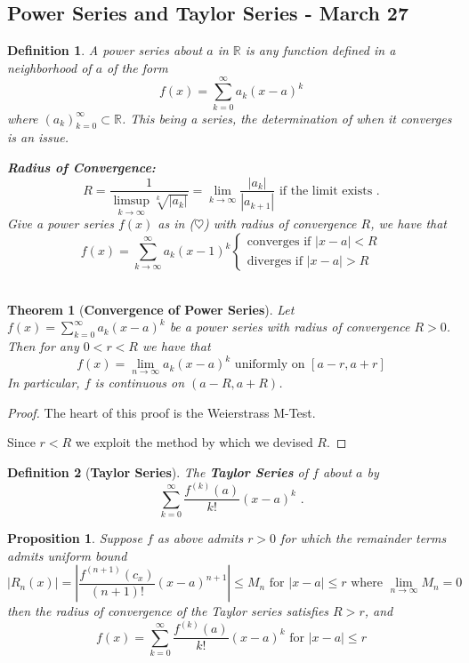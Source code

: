 \documentclass[12pt]{article}
\theoremstyle{plain}
\newtheorem{theorem}{Theorem}[subsection]
\newtheorem{definition}{Definition}[subsection]
\newtheorem{proposition}{Proposition}[subsection]
\newcommand{\abs}[1]{\left| #1 \right|}
\newcommand{\mR}{{\mathbb{R}}}
\begin{document}
\subsection{Power Series and Taylor Series - March 27}

\begin{definition}
	A power series about $a$ in $\mR$ is any function defined in a
	neighborhood of $a$ of the form
	\[
		f(x) = \sum_{k=0}^{\infty} a_k(x-a)^k 
	\]
	where $(a_k)_{k=0}^{\infty} \subset \mR$. This being a series, the 
	determination of when it converges is an issue. 

	\textbf{Radius of Convergence: } 
	\[
		R = \frac 1{\limsup _{k\to\infty} \sqrt[k]{\abs{a_k}}}
		= \lim_{k\to\infty} \frac{\abs{a_k}}{\abs{a_{k+1}}}
		\text{ if the limit exists} \,\, .
	\]
	Give a power series $f(x)$ as in ($\heartsuit$) with radius of convergence
	$R$, we have that 
	\[
		f(x) = \sum_{k\to\infty}^{\infty} a_k(x-1)^k 
		\begin{cases}
			\text{converges if } \abs{x-a} < R	\\
			\text{diverges if } \abs{x-a} > R
		\end{cases}
	\]\\ 
\end{definition}


\begin{theorem}[\textbf{Convergence of Power Series}]
	Let $f(x) = \sum_{k=0}^{\infty} a_k(x-a)^k$ be a power series with radius
	of convergence $R > 0$. Then for any $0 < r < R$ we have that 
	\[
		f(x) = \lim_{n\to\infty} a_k (x-a)^k 
		\text{ uniformly on } [a-r, a+r]
	\]
	In particular, $f$ is continuous on $(a-R, a+R)$. 
\end{theorem}
\begin{proof}
	The heart of this proof is the Weierstrass M-Test. 

	Since $r < R$ we exploit the method by which we devised $R$.
	
\end{proof}




\begin{definition}[\textbf{Taylor Series}] 
	The \textbf{Taylor Series} of $f$ about $a$ by 
	\[
		\sum_{k=0}^{\infty} \frac{f^{(k)}(a)}{k!} (x-a)^k \,\, .
	\]
\end{definition}



\begin{proposition}
	Suppose $f$ as above admits $r>0$ for which the remainder terms admits 
	uniform bound
	\[
		\abs{R_n(x)} = \abs{\frac{f^{(n+1)}(c_x)}{(n+1)!} (x-a)^{n+1}} 
		\leq M_n 
		\text{ for } \abs{x-a} \leq r 
		\text{ where } \lim_{n\to\infty} M_n = 0
	\]
	then the radius of convergence of the Taylor series satisfies $R > r$, and
	\[
		f(x) = \sum_{k=0}^{\infty} \frac{f^{(k)}(a)}{k!} (x-a)^k 
		\text{ for } \abs{x-a} \leq r
	\]
\end{proposition}
\end{document}
